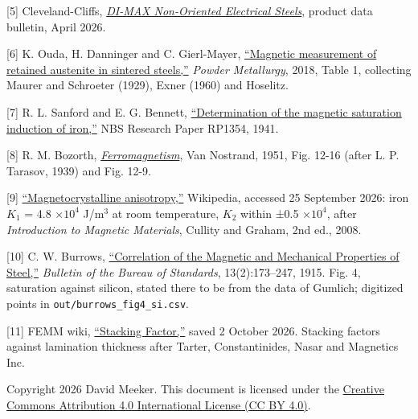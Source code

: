 \documentclass[
  11pt,
]{article}
\begin{document}
{[}5{]} Cleveland-Cliffs, \href{https://www.clevelandcliffs.com/_assets/_92ef20feb08a1fc0de91b85887c0f9e4/clevelandcliffs/db/1190/10494/file/CLF_ProductData_DiMaxM15M47_042026.pdf}{\emph{DI-MAX Non-Oriented Electrical Steels}}, product data bulletin, April 2026.

{[}6{]} K. Ouda, H. Danninger and C. Gierl-Mayer, \href{https://doi.org/10.1080/00325899.2018.1530850}{``Magnetic measurement of retained austenite in sintered steels,''} \emph{Powder Metallurgy}, 2018, Table 1, collecting Maurer and Schroeter (1929), Exner (1960) and Hoselitz.

{[}7{]} R. L. Sanford and E. G. Bennett, \href{https://nvlpubs.nist.gov/nistpubs/jres/26/jresv26n1p1_a1b.pdf}{``Determination of the magnetic saturation induction of iron,''} NBS Research Paper RP1354, 1941.

{[}8{]} R. M. Bozorth, \href{https://doi.org/10.1109/9780470544624}{\emph{Ferromagnetism}}, Van Nostrand, 1951, Fig. 12-16 (after L. P. Tarasov, 1939) and Fig. 12-9.

{[}9{]} \href{https://en.wikipedia.org/wiki/Magnetocrystalline_anisotropy}{``Magnetocrystalline anisotropy,''} Wikipedia, accessed 25 September 2026: iron \(K_1\) = 4.8 \(\times 10^{4}\) J/m\(^{3}\) at room temperature, \(K_2\) within ±0.5 \(\times 10^{4}\), after \emph{Introduction to Magnetic Materials}, Cullity and Graham, 2nd ed., 2008.

{[}10{]} C. W. Burrows, \href{https://nvlpubs.nist.gov/nistpubs/bulletin/13/nbsbulletinv13n2p173_A2b.pdf}{``Correlation of the Magnetic and Mechanical Properties of Steel,''} \emph{Bulletin of the Bureau of Standards}, 13(2):173--247, 1915. Fig. 4, saturation against silicon, stated there to be from the data of Gumlich; digitized points in \texttt{out/burrows\_fig4\_si.csv}.

{[}11{]} FEMM wiki, \href{https://www.femm.info/doku/doku.php?id=stackingfactor}{``Stacking Factor,''} saved 2 October 2026. Stacking factors against lamination thickness after Tarter, Constantinides, Nasar and Magnetics Inc.

\noindent Copyright 2026 David Meeker. This document is licensed under the \href{https://creativecommons.org/licenses/by/4.0/}{Creative Commons Attribution 4.0 International License (CC BY 4.0)}.
\end{document}
